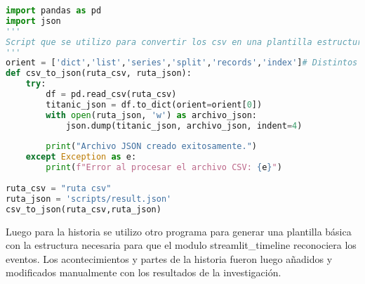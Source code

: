 \documentclass{article}
\begin{document}
\begin{lstlisting}[language=Python, caption=Script para convertir CSV en Json]
import pandas as pd
import json
'''
Script que se utilizo para convertir los csv en una plantilla estructurada de diccionario (luego de limpiarlos) para luego desde esa estructura inicial ir reestructurando el 'inventraio_ganado.json'
'''
orient = ['dict','list','series','split','records','index']# Distintos tipos de orient para la generacion del diccionario 
def csv_to_json(ruta_csv, ruta_json):
    try:
        df = pd.read_csv(ruta_csv)    
        titanic_json = df.to_dict(orient=orient[0])    
        with open(ruta_json, 'w') as archivo_json:
            json.dump(titanic_json, archivo_json, indent=4)
            
        print("Archivo JSON creado exitosamente.")
    except Exception as e:
        print(f"Error al procesar el archivo CSV: {e}")
    
ruta_csv = "ruta csv"
ruta_json = 'scripts/result.json'
csv_to_json(ruta_csv,ruta_json)
\end{lstlisting}

Luego para la historia se utilizo otro programa para generar una plantilla básica con la estructura necesaria para que el modulo streamlit\_timeline reconociera los eventos. 
Los acontecimientos y partes de la historia fueron luego añadidos y modificados manualmente con los resultados de la investigación.
\end{document}
